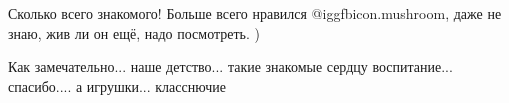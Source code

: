  
 
 
 
 

Сколько всего знакомого! Больше всего нравился  @igg{fbicon.mushroom}, даже не
знаю, жив ли он ещё, надо посмотреть. )

Как замечательно... наше детство... такие знакомые сердцу воспитание...
спасибо.... а игрушки... класснючие
